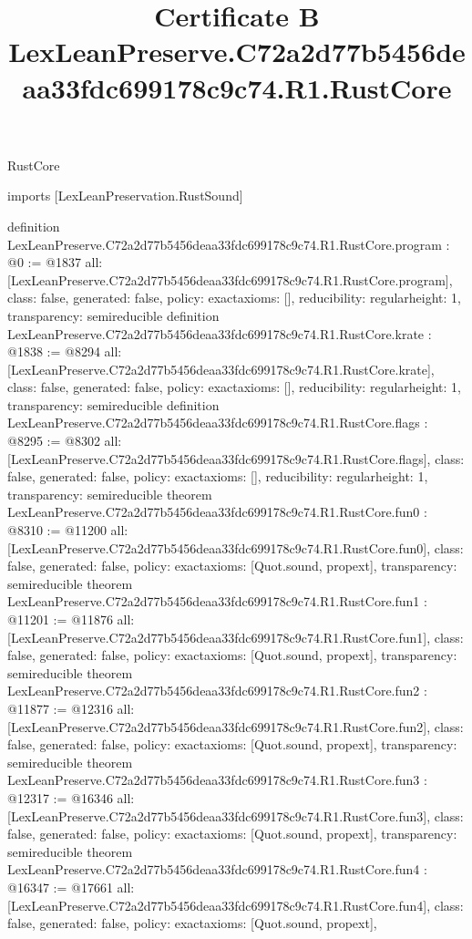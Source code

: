 \begin{lexlean}{RustCore}
\title{Certificate B LexLeanPreserve.C72a2d77b5456deaa33fdc699178c9c74.R1.RustCore}
\begin{coremodule}
imports [LexLeanPreservation.RustSound]

definition LexLeanPreserve.C72a2d77b5456deaa33fdc699178c9c74.R1.RustCore.program : @0 := @1837 {
  all: [LexLeanPreserve.C72a2d77b5456deaa33fdc699178c9c74.R1.RustCore.program],
  class: false,
  generated: false,
  policy: exact{axioms: []},
  reducibility: regular{height: 1},
  transparency: semireducible
}
definition LexLeanPreserve.C72a2d77b5456deaa33fdc699178c9c74.R1.RustCore.krate : @1838 := @8294 {
  all: [LexLeanPreserve.C72a2d77b5456deaa33fdc699178c9c74.R1.RustCore.krate],
  class: false,
  generated: false,
  policy: exact{axioms: []},
  reducibility: regular{height: 1},
  transparency: semireducible
}
definition LexLeanPreserve.C72a2d77b5456deaa33fdc699178c9c74.R1.RustCore.flags : @8295 := @8302 {
  all: [LexLeanPreserve.C72a2d77b5456deaa33fdc699178c9c74.R1.RustCore.flags],
  class: false,
  generated: false,
  policy: exact{axioms: []},
  reducibility: regular{height: 1},
  transparency: semireducible
}
theorem LexLeanPreserve.C72a2d77b5456deaa33fdc699178c9c74.R1.RustCore.fun0 : @8310 := @11200 {
  all: [LexLeanPreserve.C72a2d77b5456deaa33fdc699178c9c74.R1.RustCore.fun0],
  class: false,
  generated: false,
  policy: exact{axioms: [Quot.sound, propext]},
  transparency: semireducible
}
theorem LexLeanPreserve.C72a2d77b5456deaa33fdc699178c9c74.R1.RustCore.fun1 : @11201 := @11876 {
  all: [LexLeanPreserve.C72a2d77b5456deaa33fdc699178c9c74.R1.RustCore.fun1],
  class: false,
  generated: false,
  policy: exact{axioms: [Quot.sound, propext]},
  transparency: semireducible
}
theorem LexLeanPreserve.C72a2d77b5456deaa33fdc699178c9c74.R1.RustCore.fun2 : @11877 := @12316 {
  all: [LexLeanPreserve.C72a2d77b5456deaa33fdc699178c9c74.R1.RustCore.fun2],
  class: false,
  generated: false,
  policy: exact{axioms: [Quot.sound, propext]},
  transparency: semireducible
}
theorem LexLeanPreserve.C72a2d77b5456deaa33fdc699178c9c74.R1.RustCore.fun3 : @12317 := @16346 {
  all: [LexLeanPreserve.C72a2d77b5456deaa33fdc699178c9c74.R1.RustCore.fun3],
  class: false,
  generated: false,
  policy: exact{axioms: [Quot.sound, propext]},
  transparency: semireducible
}
theorem LexLeanPreserve.C72a2d77b5456deaa33fdc699178c9c74.R1.RustCore.fun4 : @16347 := @17661 {
  all: [LexLeanPreserve.C72a2d77b5456deaa33fdc699178c9c74.R1.RustCore.fun4],
  class: false,
  generated: false,
  policy: exact{axioms: [Quot.sound, propext]},
}
\end{coremodule}
\end{lexlean}
